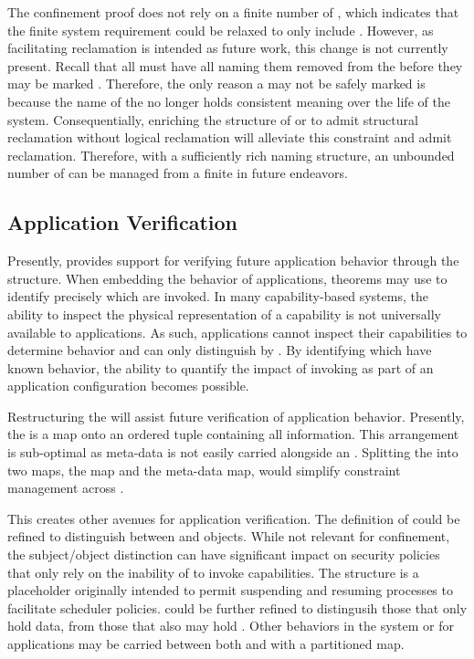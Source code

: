 The confinement proof does not rely on a finite number of \TMunborn{} \TMobjs{}, which indicates that the finite system requirement could be relaxed to only include \TMextant{} \TMobjs{}.
However, as facilitating \TMdead{} \TMobj{} reclamation is intended as future work, this change is not currently present.
Recall that all \TMunborn{} \TMobjs{} must have all \TMcaps{} naming them removed from the \TMsystemState{} before they may be marked \TMalive{}.
Therefore, the only reason a \TMdead{} \TMobj{} may not be safely marked \TMunborn{} is because the name of the \TMobj{} no longer holds consistent meaning over the life of the system.
Consequentially, enriching the structure of \TMrefs{} or \TMcaps{} to admit structural reclamation without logical reclamation will alleviate this constraint and admit \TMobj{} reclamation.
Therefore, with a sufficiently rich naming structure, an unbounded number of \TMobjs{} can be managed from a finite \TMsystemState{} in future endeavors.

\subsection{Application Verification}

Presently, \TMmodelName{} provides support for verifying future application behavior through the \TMidx{} structure.
When embedding the behavior of applications, theorems may use \TMidxs{} to identify precisely which \TMcaps{} are invoked.
In many capability-based systems, the ability to inspect the physical representation of a capability is not universally available to applications.
As such, applications cannot inspect their capabilities to determine behavior and can only distinguish \TMcaps{} by \TMidx{}.
By identifying which \TMobjs{} have known behavior, the ability to quantify the impact of invoking \TMcaps{} as part of an application configuration becomes possible.

Restructuring the \TMsystemState{} will assist future verification of application behavior.
Presently, the \TMsystemState{} is a map onto an ordered tuple containing all \TMobj{} information.
This arrangement is sub-optimal as \TMobj{} meta-data is not easily carried alongside an \TMaccessGraph{}.
Splitting the \TMsystemState{} into two maps, the \TMobj{} map and the meta-data map, would simplify constraint management across \TMaccessGraph{}.

This creates other avenues for application verification.
The definition of \COQtransfer{} could be refined to distinguish between \TMactive{} and \TMpassive{} objects.
While not relevant for confinement, the subject/object distinction can have significant impact on security policies that only rely on the inability of \TMpassive{} \TMobjs{} to invoke capabilities.
The \TMschedule{} structure is a placeholder originally intended to permit suspending and resuming processes to facilitate scheduler policies.
\xmakefirstuc{\TMobjs{}} could be further refined to distingusih those that only hold data, from those that also may hold \TMcaps{}.
Other behaviors in the system or for applications may be carried between both \TMsystemStates{} and \TMaccessGraphs{} with a partitioned map.

